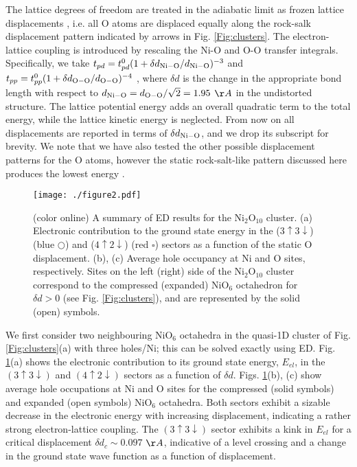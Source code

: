 \documentclass[showpacs,preprintnumbers,amsmath,amssymb,prl,aps,twocolumn,superscriptaddress]{revtex4}
\begin{document}
The lattice degrees of freedom are treated in the adiabatic limit 
as frozen lattice displacements \cite{phonons}, i.e. all O atoms are
displaced equally  
along the rock-salk displacement pattern 
indicated by arrows in Fig. \ref{Fig:clusters}. The electron-lattice 
coupling is introduced by rescaling the Ni-O and O-O 
transfer integrals. Specifically, we take 
$t_{pd} = t_{pd}^0(1 + \delta d_{\rm Ni-O}/d_{\rm Ni-O})^{-3}$ and 
$t_{pp} = t_{pp}^0(1 + \delta d_{\rm O-O}/d_{\rm O-O})^{-4}$
\cite{Harrison, LauPRL2013},  
where $\delta d$ is the change in the appropriate bond length 
with respect to $d_{\rm Ni-O} = d_{\rm O-O}/\sqrt{2} = 1.95$ $\AA$ in the 
undistorted structure. The lattice potential energy adds an overall 
quadratic term to the total energy, while the lattice kinetic energy
is neglected.    
From now on all displacements are reported in terms of  $\delta
d_{\rm Ni-O}$, and we drop its subscript for 
brevity. We note that we have also tested the other possible displacement 
patterns for the O atoms, however the static rock-salt-like pattern discussed
here produces the lowest energy \cite{Supplement}.

\begin{figure}
 \texttt{[image: ./figure2.pdf]}
 \caption{\label{Fig:ED_Chain} (color online)
 A summary of ED results for the Ni$_2$O$_{10}$ cluster. 
 (a) Electronic contribution to the ground state energy in the
 ($3\uparrow 3\downarrow$) (blue $\bigcirc$)  
 and ($4\uparrow2\downarrow$) (red $\square$) sectors as a function of the 
 static O displacement. (b), (c) Average hole occupancy at Ni 
 and O sites, respectively.  Sites on the left (right)  
 side of the Ni$_2$O$_{10}$ cluster correspond to the compressed 
 (expanded) NiO$_6$ 
 octahedron for $\delta d >0$ (see Fig. \ref{Fig:clusters}), 
 and are represented by the solid (open) symbols.  
 }   
\end{figure}

We first consider two neighbouring NiO$_6$ octahedra 
in the quasi-1D cluster of Fig. \ref{Fig:clusters}(a) with three holes/Ni;  
this can be solved exactly using ED.  
Fig. \ref{Fig:ED_Chain}(a) shows the electronic 
contribution to its ground state energy, $E_{el}$,
in the $(3\uparrow3\downarrow)$ and $(4\uparrow2\downarrow)$  
sectors as a function of $\delta d$.  Figs. \ref{Fig:ED_Chain}(b), (c)
show average hole  occupations at Ni and O sites   
for the compressed (solid symbols) and expanded (open symbols) NiO$_6$ octahedra. 
Both sectors exhibit a sizable decrease in the electronic energy with increasing    
displacement, indicating a rather strong electron-lattice coupling. 
The $(3\uparrow3\downarrow)$ sector exhibits a kink in $E_{el}$ 
for a critical displacement $\delta d_c\sim 0.097$ $\AA$, indicative
of a level crossing and a change in the ground state  
wave function as a function of displacement. 
\end{document}
